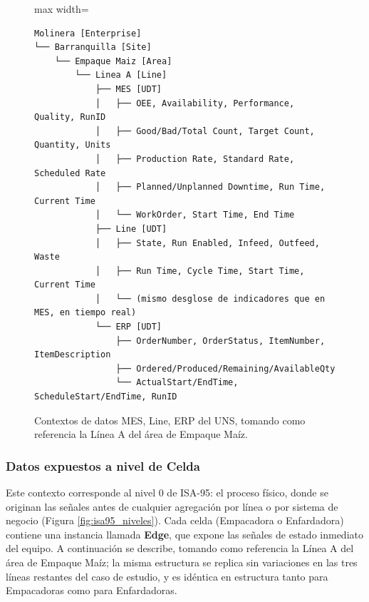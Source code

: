 \begin{figure}[H]
\centering
\begin{adjustbox}{max width=\columnwidth}
\begin{BVerbatim}
Molinera [Enterprise]
└── Barranquilla [Site]
    └── Empaque Maiz [Area]
        └── Linea A [Line]
            ├── MES [UDT]
            │   ├── OEE, Availability, Performance, Quality, RunID
            │   ├── Good/Bad/Total Count, Target Count, Quantity, Units
            │   ├── Production Rate, Standard Rate, Scheduled Rate
            │   ├── Planned/Unplanned Downtime, Run Time, Current Time
            │   └── WorkOrder, Start Time, End Time
            ├── Line [UDT]
            │   ├── State, Run Enabled, Infeed, Outfeed, Waste
            │   ├── Run Time, Cycle Time, Start Time, Current Time
            │   └── (mismo desglose de indicadores que en MES, en tiempo real)
            └── ERP [UDT]
                ├── OrderNumber, OrderStatus, ItemNumber, ItemDescription
                ├── Ordered/Produced/Remaining/AvailableQty
                └── ActualStart/EndTime, ScheduleStart/EndTime, RunID
\end{BVerbatim}
\end{adjustbox}
\caption{Contextos de datos MES, Line, ERP del UNS, tomando como
referencia la Línea A del área de Empaque Maíz.}
\label{fig:uns_tree_contextos}
\end{figure}

\subsubsection{Datos expuestos a nivel de Celda}
\label{sec:datos_celda}

Este contexto corresponde al nivel 0 de ISA-95: el proceso físico, donde se originan las señales antes de cualquier agregación por línea o por sistema de negocio (Figura \ref{fig:isa95_niveles}). Cada celda (Empacadora o Enfardadora) contiene una instancia llamada \textbf{Edge}, que expone las señales de estado inmediato del equipo. A continuación se describe, tomando como referencia la Línea A del área de Empaque Maíz; la misma estructura se replica sin variaciones en las tres líneas restantes del caso de estudio, y es idéntica en estructura tanto para Empacadoras como para Enfardadoras.

